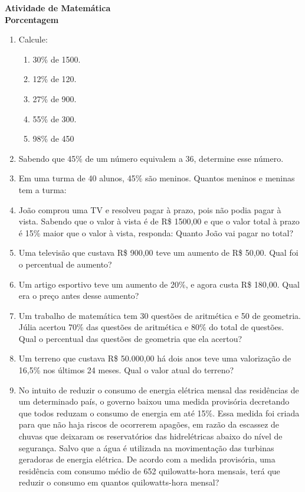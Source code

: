 \documentclass[twocolumn,oneside,a4paper,12pt]{article}
\begin{document}
\pagestyle{empty}
\begin{center}
\textbf{Atividade de Matemática\\Porcentagem}
\end{center}

\begin{enumerate}

\item Calcule:
\begin{enumerate}
\item 30\% de 1500.
\item 12\% de 120. 
\item 27\% de 900.
\item 55\% de 300.
\item 98\% de 450
\end{enumerate}

\item Sabendo que 45\% de um número equivalem a 36, determine esse número.

\item Em uma turma de 40 alunos, 45\% são meninos. Quantos  meninos  e  meninas  tem a turma:

\item João comprou uma TV e resolveu pagar à prazo, pois não podia pagar à vista. Sabendo que o valor à vista é de R\$ 1500,00 e que o valor total à prazo é 15\% maior que o valor à vista, responda: Quanto João vai pagar no total?

\item Uma  televisão  que custava  R\$  900,00  teve um   aumento   de   R\$   50,00.   Qual   foi   o percentual de aumento?

\item Um artigo esportivo teve um aumento de 20\%, e agora custa R\$ 180,00. Qual era o preço antes desse aumento?

\item Um trabalho de matemática tem 30 questões de aritmética e 50 de geometria. Júlia acertou 70\% das questões de aritmética e 80\% do total de questões. Qual o percentual das questões de geometria que ela acertou?

\item Um  terreno  que  custava  R\$  50.000,00  há dois anos teve  uma  valorização  de 16,5\% nos  últimos 24 meses. Qual o valor atual do terreno?

\item No intuito de reduzir o consumo de energia elétrica mensal das residências de um determinado país, o governo baixou uma medida provisória decretando que todos reduzam o consumo de energia em até 15\%. Essa medida foi criada para que não haja riscos de ocorrerem apagões, em razão da escassez de chuvas que deixaram os reservatórios das hidrelétricas abaixo do nível de segurança. Salvo que a água é utilizada na movimentação das turbinas geradoras de energia elétrica. De acordo com a medida provisória, uma residência com consumo médio de 652 quilowatts-hora mensais, terá que reduzir o consumo em quantos quilowatts-hora mensal?


\end{enumerate}
\end{document}
